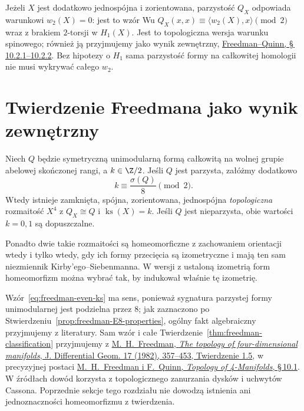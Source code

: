 Jeżeli $X$ jest dodatkowo jednospójna i zorientowana,
parzystość $Q_X$ odpowiada warunkowi
$w_2(X)=0$: jest to wzór Wu
$Q_X(x,x)\equiv\langle w_2(X),x\rangle\pmod2$
wraz z brakiem $2$-torsji w $H_1(X)$.
Jest to topologiczna wersja warunku spinowego;
również ją przyjmujemy jako wynik zewnętrzny,
\href{https://archive.mpim-bonn.mpg.de/4789/2/FreedmanQuinn-TopologyOf4Manifolds-Reformatted2013.pdf}
{Freedman--Quinn, \S\,10.2.1--10.2.2}.
Bez hipotezy o $H_1$ sama parzystość formy na
całkowitej homologii nie musi wykrywać całego $w_2$.

\section{Twierdzenie Freedmana jako wynik zewnętrzny}
\label{sec:freedman-classification}

\begin{twierdzenie}
\label{thm:freedman-classification}
Niech $Q$ będzie symetryczną unimodularną formą
całkowitą na wolnej grupie abelowej skończonej rangi,
a $k\in\Z/2$. Jeśli $Q$ jest parzysta, załóżmy
dodatkowo
\begin{equation}\label{eq:freedman-even-ks}
 k\equiv\frac{\sigma(Q)}8\pmod2.
\end{equation}
Wtedy istnieje zamknięta, spójna, zorientowana,
jednospójna \emph{topologiczna} rozmaitość
$X^4$ z $Q_X\cong Q$ i $\operatorname{ks}(X)=k$.
Jeśli $Q$ jest nieparzysta, obie wartości $k=0,1$
są dopuszczalne.

Ponadto dwie takie rozmaitości są homeomorficzne
z zachowaniem orientacji wtedy i tylko wtedy,
gdy ich formy przecięcia są izometryczne i mają
ten sam niezmiennik Kirby'ego--Siebenmanna.
W wersji z ustaloną izometrią form homeomorfizm
można wybrać tak, by indukował właśnie tę izometrię.
\end{twierdzenie}

Wzór~\eqref{eq:freedman-even-ks} ma sens, ponieważ
sygnatura parzystej formy unimodularnej jest podzielna
przez $8$; jak zaznaczono po
Stwierdzeniu~\ref{prop:freedman-E8-properties},
ogólny fakt algebraiczny przyjmujemy z literatury.
Sam wzór i całe Twierdzenie~\ref{thm:freedman-classification}
przyjmujemy z
\href{https://projecteuclid.org/journals/journal-of-differential-geometry/volume-17/issue-3/The-topology-of-four-dimensional-manifolds/10.4310/jdg/1214437136.full}
{M.\ H.\ Freedman, \emph{The topology of four-dimensional
manifolds}, J. Differential Geom. 17 (1982), 357--453,
Twierdzenie 1.5}, w precyzyjnej postaci
\href{https://archive.mpim-bonn.mpg.de/4789/2/FreedmanQuinn-TopologyOf4Manifolds-Reformatted2013.pdf}
{M.\ H.\ Freedman i F.\ Quinn, \emph{Topology of
4-Manifolds}, \S\,10.1}.
W źródłach dowód korzysta z topologicznego zanurzania
dysków i uchwytów Cassona. Poprzednie sekcje tego
rozdziału nie dowodzą istnienia ani jednoznaczności
homeomorfizmu z twierdzenia.

